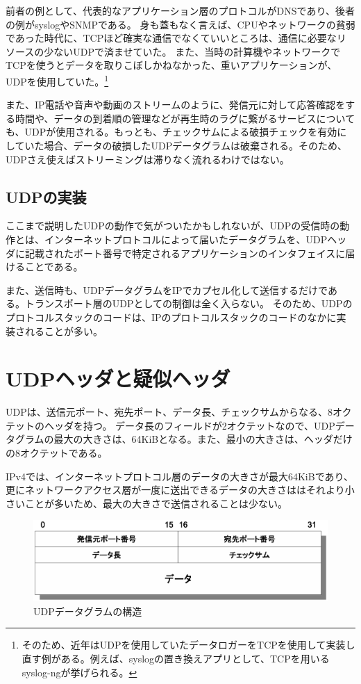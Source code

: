 前者の例として、代表的なアプリケーション層のプロトコルがDNSであり、後者の例がsyslogやSNMPである。
身も蓋もなく言えば、CPUやネットワークの貧弱であった時代に、TCPほど確実な通信でなくていいところは、通信に必要なリソースの少ないUDPで済ませていた。
また、当時の計算機やネットワークでTCPを使うとデータを取りこぼしかねなかった、重いアプリケーションが、UDPを使用していた。\footnote{そのため、近年はUDPを使用していたデータロガーをTCPを使用して実装し直す例がある。例えば、syslogの置き換えアプリとして、TCPを用いるsyslog-ngが挙げられる。}

また、IP電話や音声や動画のストリームのように、発信元に対して応答確認をする時間や、データの到着順の管理などが再生時のラグに繋がるサービスについても、UDPが使用される。もっとも、チェックサムによる破損チェックを有効にしていた場合、データの破損したUDPデータグラムは破棄される。そのため、UDPさえ使えばストリーミングは滞りなく流れるわけではない。


\subsection{UDPの実装}
ここまで説明したUDPの動作で気がついたかもしれないが、UDPの受信時の動作とは、インターネットプロトコルによって届いたデータグラムを、UDPヘッダに記載されたポート番号で特定されるアプリケーションのインタフェイスに届けることである。

また、送信時も、UDPデータグラムをIPでカプセル化して送信するだけである。トランスポート層のUDPとしての制御は全く入らない。
そのため、UDPのプロトコルスタックのコードは、IPのプロトコルスタックのコードのなかに実装されることが多い。


\section{UDPヘッダと疑似ヘッダ}

UDPは、送信元ポート、宛先ポート、データ長、チェックサムからなる、8オクテットのヘッダを持つ。
データ長のフィールドが2オクテットなので、UDPデータグラムの最大の大きさは、64KiBとなる。また、最小の大きさは、ヘッダだけの8オクテットである。

IPv4では、インターネットプロトコル層のデータの大きさが最大64KiBであり、更にネットワークアクセス層が一度に送出できるデータの大きさははそれより小さいことが多いため、最大の大きさで送信されることは少ない。

\begin{figure}[htbp]
	\includegraphics[width=12cm,clip]{draw/udpdatagram.eps}
	\caption{UDPデータグラムの構造}
	\label{fig:udpdatagram}
\end{figure}

